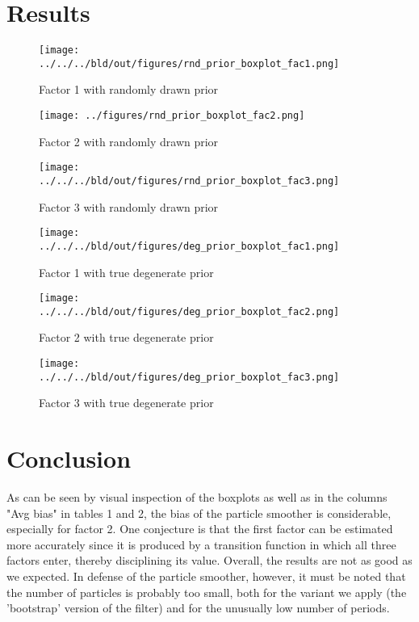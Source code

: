 \documentclass[11pt, a4paper, leqno]{article}
\begin{document}
\section{Results}
\label{sec: results}


\begin{figure}
	\centering
 		\caption{Factor 1 with randomly drawn prior}
\texttt{[image: ../../../bld/out/figures/rnd\_prior\_boxplot\_fac1.png]}
 	
\end{figure}

\begin{figure}
	\centering
 		\caption{Factor 2 with randomly drawn prior}
\texttt{[image: ../figures/rnd\_prior\_boxplot\_fac2.png]}
\end{figure}

\begin{figure}
	\centering
 		\caption{Factor 3 with randomly drawn prior}
\texttt{[image: ../../../bld/out/figures/rnd\_prior\_boxplot\_fac3.png]}
\end{figure}
\begin{figure}
	\centering
 		\caption{Factor 1 with true degenerate prior}
\texttt{[image: ../../../bld/out/figures/deg\_prior\_boxplot\_fac1.png]}

\end{figure}

\begin{figure}
	\centering
 		\caption{Factor 2 with true degenerate prior}
\texttt{[image: ../../../bld/out/figures/deg\_prior\_boxplot\_fac2.png]}
\end{figure}
\begin{figure}
	\centering
 		\caption{Factor 3 with true degenerate prior}
\texttt{[image: ../../../bld/out/figures/deg\_prior\_boxplot\_fac3.png]}
 
\end{figure}

\section{Conclusion}
As can be seen by visual inspection of the boxplots as well as in the columns "Avg bias" in tables 1 and 2, the bias of the particle smoother is considerable, especially for factor 2. One conjecture is that the first factor can be estimated more accurately since it is produced by a transition function in which all three factors enter, thereby disciplining its value. Overall, the results are not as good as we expected. In defense of the particle smoother, however, it must be noted that the number of particles is probably too small, both for the variant we apply (the 'bootstrap' version of the filter) and for the unusually low number of periods.
\newpage











\clearpage







\end{document}
